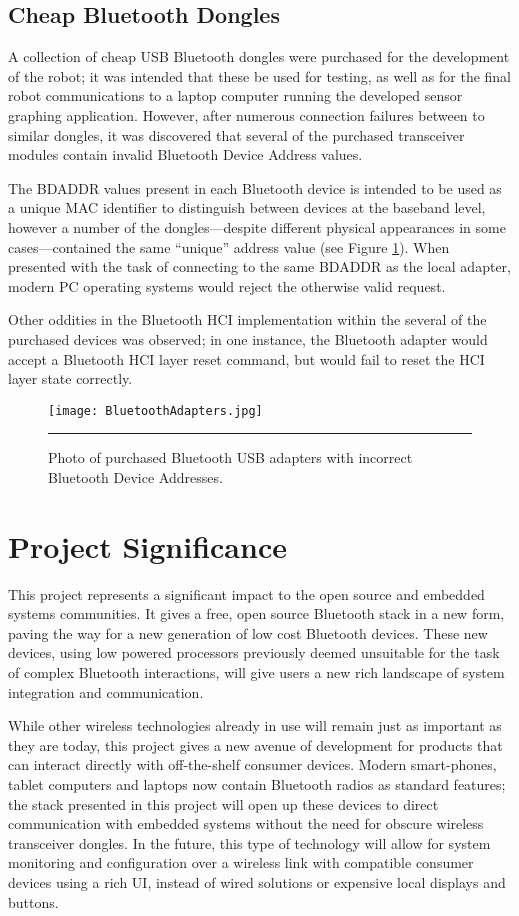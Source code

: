 \FloatBarrier
\subsection{Cheap Bluetooth Dongles}

A collection of cheap USB Bluetooth dongles were purchased for the development of the robot; it was intended that these be used for testing, as well as for the final robot communications to a laptop computer running the developed sensor graphing application. However, after numerous connection failures between to similar dongles, it was discovered that several of the purchased transceiver modules contain invalid Bluetooth Device Address values.

The BDADDR values present in each Bluetooth device is intended to be used as a unique MAC identifier to distinguish between devices at the baseband level, however a number of the dongles---despite different physical appearances in some cases---contained the same ``unique'' address value (see Figure \ref{fig:btadapters}). When presented with the task of connecting to the same BDADDR as the local adapter, modern PC operating systems would reject the otherwise valid request.

Other oddities in the Bluetooth HCI implementation within the several of the purchased devices was observed; in one instance, the Bluetooth adapter would accept a Bluetooth HCI layer reset command, but would fail to reset the HCI layer state correctly.

\begin{figure}[tbph]
	\centering
		\texttt{[image: BluetoothAdapters.jpg]}
	\rule{35em}{0.5pt}
	\caption[Incorrectly Addressed Bluetooth Adapters]{Photo of purchased Bluetooth USB adapters with incorrect Bluetooth Device Addresses.}
	\label{fig:btadapters}
\end{figure}

\FloatBarrier
\section{Project Significance}

This project represents a significant impact to the open source and embedded systems communities. It gives a free, open source Bluetooth stack in a new form, paving the way for a new generation of low cost Bluetooth devices. These new devices, using low powered processors previously deemed unsuitable for the task of complex Bluetooth interactions, will give users a new rich landscape of system integration and communication.

While other wireless technologies already in use will remain just as important as they are today, this project gives a new avenue of development for products that can interact directly with off-the-shelf consumer devices. Modern smart-phones, tablet computers and laptops now contain Bluetooth radios as standard features; the stack presented in this project will open up these devices to direct communication with embedded systems without the need for obscure wireless transceiver dongles. In the future, this type of technology will allow for system monitoring and configuration over a wireless link with compatible consumer devices using a rich UI, instead of wired solutions or expensive local displays and buttons.